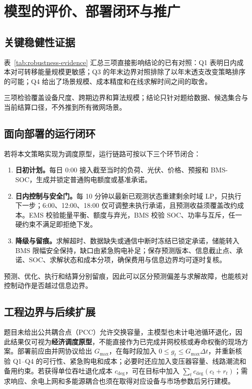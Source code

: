 \section{模型的评价、部署闭环与推广}
\label{sec:evaluation}

\subsection{关键稳健性证据}

表~\ref{tab:robustness-evidence} 汇总三项直接影响结论的已有对照：Q1 表明日内成本对可转移能量规模更敏感；Q3 的年末边界对照排除了以年末透支改变策略排序的可能；Q4 给出了场景规模、成本精度和在线求解时间之间的取舍。



三项检验覆盖设备尺度、跨期边界和算法规模；结论只针对题给数据、候选集合与当前结算口径，不外推到所有微网场景。

\subsection{面向部署的运行闭环}

若将本文策略实现为调度原型，运行链路可按以下三个环节闭合：

\begin{enumerate}[label=\textbf{D\arabic*：},leftmargin=4.2em,labelsep=0.4em,itemsep=0.3em]
\item \textbf{日初计划。}每日 0:00 接入截至当时的负荷、光伏、价格、预报和 BMS-SOC，生成并锁定普通购电额度或基准承诺。
\item \textbf{日内控制与安全门。}每 10 分钟以最新已观测状态重建剩余时域 LP，只执行下一步；6:00、12:00、18:00 仅可调整未执行承诺，且预测收益须覆盖改约成本。EMS 校验能量平衡、额度与弃光，BMS 校验 SOC、功率与互斥，任一硬约束不满足即拒绝下发。
\item \textbf{降级与留痕。}求解超时、数据缺失或通信中断时冻结已锁定承诺，储能转入 BMS 限幅安全保持，缺口由紧急购电补足；保存预测版本、信息截止点、承诺、SOC、求解状态和成本分项，确保费用与信息边界均可逐时复核。
\end{enumerate}

预测、优化、执行和结算分别留痕，因此可以区分预测偏差与求解故障，也能核对控制动作是否越过信息边界。

\subsection{工程边界与后续扩展}

题目未给出公共耦合点（PCC）允许交换容量，主模型也未计电池循环退化，因此结果仅可视为\textbf{经济调度原型}，不能直接作为已完成并网校核或寿命权衡的现场方案。部署前应由并网协议给出 $G_{\max}$，在每时段加入 $0\le g_t\le G_{\max}\Delta t$，并重新核验 Q1--Q4 的可行性、紧急购电和成本；必要时还应加入变压器容量、线路潮流和备用约束。若获得单位吞吐退化成本 $c_{\mathrm{deg}}$，可在目标中加入 $\sum_t c_{\mathrm{deg}}(c_t+r_t)$；需求响应、余电上网和多能源耦合也须在取得对应设备与市场参数后另行建模。
